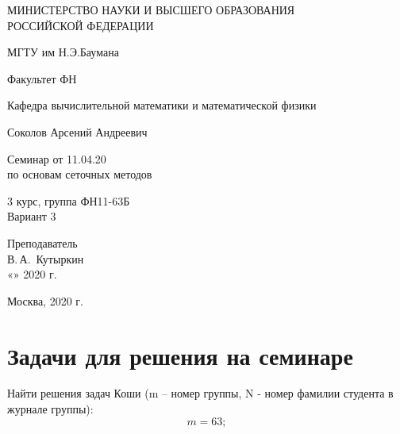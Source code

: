 \documentclass[14pt,a4paper]{scrartcl}
\begin{document}
	\begin{titlepage}
	\begin{center}
		\large
		МИНИСТЕРСТВО НАУКИ И ВЫСШЕГО ОБРАЗОВАНИЯ\\ РОССИЙСКОЙ ФЕДЕРАЦИИ
		
		\vspace{0.5cm}
		
		МГТУ им Н.Э.Баумана
		\vspace{0.25cm}
		
		Факультет ФН
		
		Кафедра вычислительной математики и математической физики
		\vfill
		
		
		Соколов Арсений Андреевич\\
		\vfill
		
		
		{\LARGE Семинар от 11.04.20 \\ по основам сеточных методов\\[2mm]
		}
		\bigskip
		
		3 курс, группа ФН11-63Б\\
		Вариант 3
	\end{center}
	\vfill
	
	\newlength{\ML}
	\hfill\begin{minipage}{0.4\textwidth}
		Преподаватель\\
		\underline{\hspace{3cm}} В.\,А.~Кутыркин\\
		«\underline{\hspace{0.7cm}}» \underline{\hspace{1.71cm}} 2020 г.
	\end{minipage}%
	\bigskip
	
	
	\vfill
	
	\begin{center}
		Москва, 2020 г.
	\end{center}
\end{titlepage}

\section*{Задачи для решения на семинаре}
Найти решения задач Коши (m -- номер группы, N - номер фамилии студента в журнале группы):
\begin{equation*}
	m = 63;
\end{equation*}
\end{document}

